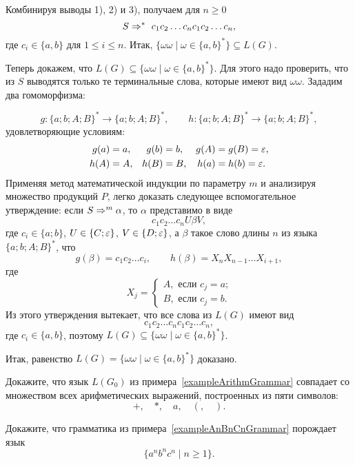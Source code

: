 \begin{myexample}
Комбинируя выводы 1), 2) и 3), получаем для $n\ge 0$
\[
	S \Rightarrow^*~c_1c_2\ldots c_nc_1c_2\ldots c_n,
\]
где $c_i\in\{a,b\}$ для $1\le i\le n$. Итак, $\{\omega\omega\mid\omega\in\{a,b\}^*\}\subseteq L(G)$.

Теперь докажем, что $L(G)\subseteq\{\omega\omega\mid\omega\in\{a,b\}^*\}$. Для этого надо проверить, что из $S$ выводятся только те терминальные слова, которые имеют вид $\omega\omega$. Зададим два гомоморфизма:

\[
	g\colon\{a;b;A;B\}^* \to \{a;b;A;B\}^*, \qquad
    h\colon\{a;b;A;B\}^* \to \{a;b;A;B\}^*,
\]
удовлетворяющие условиям:
\begin{align*}
    g(a)&=a, &
    g(b)&=b,  &
    g(A)&=g(B)=\varepsilon, \\
    h(A)&=A,  &
    h(B)&=B,  &
    h(a)&=h(b)=\varepsilon.
\end{align*}
Применяя метод математической индукции по параметру $m$ и анализируя множество продукций $P$, легко доказать следующее вспомогательное утверждение: если $S \Rightarrow^m \alpha$, то $\alpha$ представимо в виде
\[
    c_1c_2\ldots c_nU\beta V,
\]
где $c_i\in\{a;b\}$, $U\in\{C;\varepsilon\}$, $V\in\{D;\varepsilon\}$, а $\beta$ такое слово длины $n$ из языка $\{a;b;A;B\}^*$, что
\[
    g(\beta)=c_1c_2\ldots c_i, \qquad
    h(\beta)=X_nX_{n-1}\ldots X_{i+1},
\]
где
\[
    X_j =
        \begin{cases}
            A, \text{ если $c_{j}=a$;} \\
            B, \text{ если $c_{j}=b$.}
        \end{cases}
\]
Из этого утверждения вытекает, что все слова из $L(G)$ имеют вид
\[
    c_1c_2\ldots c_nc_1c_2\ldots c_n,
\]
где $c_i\in\{a,b\}$, поэтому $L(G)\subseteq\{\omega\omega\mid\omega\in\{a,b\}^*\}$.

Итак, равенство $L(G)=\{\omega\omega\mid\omega\in\{a,b\}^*\}$ доказано.
\end{myexample}

\begin{myproblem}
Докажите, что язык $L(G_0)$ из примера~\ref{exampleArithmGrammar} совпадает со множеством всех арифметических выражений, построенных из пяти символов:
\[
    +, \quad *, \quad a, \quad (, \quad ).
\]
\end{myproblem}

\begin{myproblem}
Докажите, что грамматика из примера~\ref{exampleAnBnCnGrammar} порождает язык \[\{a^nb^nc^n\mid n\ge 1\}.\]
\end{myproblem}

